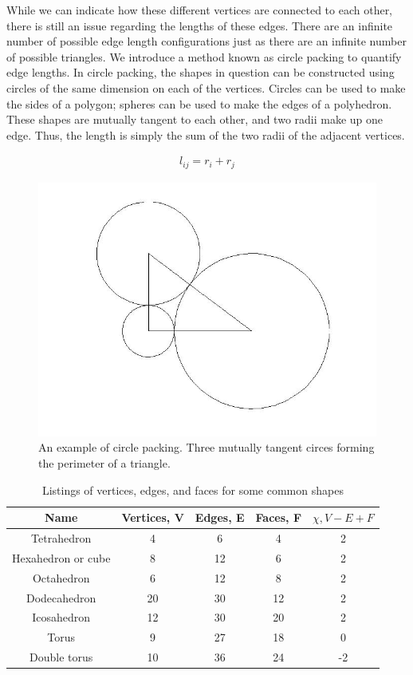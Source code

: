 \documentclass[12pt]{article}
\begin{document}
\noindent While we can indicate how these different vertices are connected to each other, there is still an issue regarding the lengths of these edges. There are an infinite number of possible edge length configurations just as there are an infinite number of possible triangles. We introduce a method known as circle packing to quantify edge lengths. In circle packing, the shapes in question can be constructed using circles of the same dimension on each of the vertices. Circles can be used to make the sides of a polygon; spheres can be used to make the edges of a polyhedron. These shapes are mutually tangent to each other, and two radii make up one edge. Thus, the length is simply the sum of the two radii of the adjacent vertices.
  
  \begin{eqnarray*}
  l_{ij} = r_i + r_j
  \end{eqnarray*}
  
\begin{figure}
\begin{center}
\includegraphics[scale = 0.3]{righttriangulation.jpg}
\end{center}
\caption{An example of circle packing. Three mutually tangent circes forming the perimeter of a triangle.}
\end{figure}

\begin{table}
\begin{tabular}{ccccc}
\label{EuChar}
Name  &	Vertices, V &	Edges, E & Faces, F &	$\chi, V - E + F$\\
\hline 
Tetrahedron &	4 &	6 &	4 &	2\\
Hexahedron or cube &	8 &	12 &	6 &	2\\
Octahedron 	&	6 &	12 &	8 & 2\\
Dodecahedron 	&	20 &	30 &	12 &	2\\
Icosahedron &	12 & 30 & 20 &	2\\
Torus & 9 & 27 & 18 & 0\\
Double torus & 10 & 36 & 24 & -2
\end{tabular}
\caption{Listings of vertices, edges, and faces for some common shapes \cite{wiki}}
\end{table}
\end{document}
